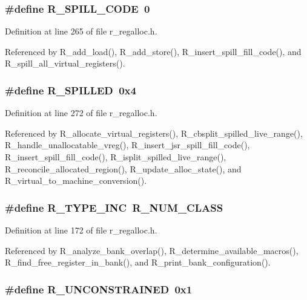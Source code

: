 \subsubsection{\setlength{\rightskip}{0pt plus 5cm}\#define R\_\-SPILL\_\-CODE~0}\label{r__regalloc_8h_eed56d7c3b732db6229cb720584aaffe}




Definition at line 265 of file r\_\-regalloc.h.

Referenced by R\_\-add\_\-load(), R\_\-add\_\-store(), R\_\-insert\_\-spill\_\-fill\_\-code(), and R\_\-spill\_\-all\_\-virtual\_\-registers().
\subsubsection{\setlength{\rightskip}{0pt plus 5cm}\#define R\_\-SPILLED~0x4}\label{r__regalloc_8h_8ed8b0c1661069e068898fb73c0a58e8}




Definition at line 272 of file r\_\-regalloc.h.

Referenced by R\_\-allocate\_\-virtual\_\-registers(), R\_\-cbsplit\_\-spilled\_\-live\_\-range(), R\_\-handle\_\-unallocatable\_\-vreg(), R\_\-insert\_\-jsr\_\-spill\_\-fill\_\-code(), R\_\-insert\_\-spill\_\-fill\_\-code(), R\_\-isplit\_\-spilled\_\-live\_\-range(), R\_\-reconcile\_\-allocated\_\-region(), R\_\-update\_\-alloc\_\-state(), and R\_\-virtual\_\-to\_\-machine\_\-conversion().
\subsubsection{\setlength{\rightskip}{0pt plus 5cm}\#define R\_\-TYPE\_\-INC~R\_\-NUM\_\-CLASS}\label{r__regalloc_8h_30a850cab48e3b5e8701380cde56af69}




Definition at line 172 of file r\_\-regalloc.h.

Referenced by R\_\-analyze\_\-bank\_\-overlap(), R\_\-determine\_\-available\_\-macros(), R\_\-find\_\-free\_\-register\_\-in\_\-bank(), and R\_\-print\_\-bank\_\-configuration().
\subsubsection{\setlength{\rightskip}{0pt plus 5cm}\#define R\_\-UNCONSTRAINED~0x1}\label{r__regalloc_8h_0488c162a30b0e19789f7ed782e50e3b}




